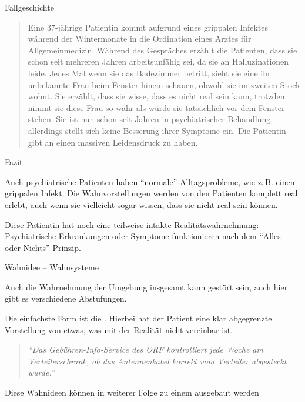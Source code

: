 \Text
{Fallgeschichte}%
{%
\begin{quotation}
Eine 37-jährige Patientin kommt aufgrund eines
grippalen Infektes während der Wintermonate in die
Ordination eines Arztes für Allgemeinmedizin. Während des
Gespräches erzählt die Patienten, dass sie schon seit
mehreren Jahren arbeitsunfähig sei, da sie an
Halluzinationen leide. Jedes Mal wenn sie das Badezimmer
betritt, sieht sie eine ihr unbekannte Frau beim Fenster
hinein schauen, obwohl sie im zweiten Stock wohnt. Sie
erzählt, dass sie wisse, dass es nicht real sein kann,
trotzdem nimmt sie diese Frau so wahr als würde sie
tatsächlich vor dem Fenster stehen. Sie ist nun schon seit
Jahren in psychiatrischer Behandlung, allerdings stellt
sich keine Besserung ihrer Symptome ein. Die Patientin gibt
an einen massiven Leidensdruck zu haben.
\end{quotation}
}%


\Text
{Fazit}%
{%
Auch psychiatrische Patienten haben \enquote{normale}
Alltagsprobleme, wie z.\,B. einen grippalen Infekt. Die
Wahnvorstellungen werden von den Patienten komplett real
erlebt, auch wenn sie vielleicht sogar wissen, dass sie nicht
real sein können. 

Diese Patientin hat noch eine teilweise
intakte Realitätswahrnehmung: Psychiatrische Erkrankungen
oder Symptome funktionieren  nach dem
\enquote{Alles-oder-Nichts}-Prinzip.
}%


\Text
{Wahnidee -- Wahnsysteme}%
{%
Auch die Wahrnehmung der Umgebung insgesamt kann gestört
sein, auch hier gibt es verschiedene Abstufungen. 

Die einfachste Form ist die . Hierbei hat der
Patient eine klar abgegrenzte Vorstellung von etwas, was mit
der Realität nicht vereinbar ist. 

\begin{quotation}
\emph{\enquote{Das
Gebühren-Info-Service des ORF kontrolliert jede Woche am
Verteilerschrank, ob das Antennenkabel korrekt vom
Verteiler abgesteckt wurde.}}
\end{quotation}

Diese Wahnideen können in weiterer Folge zu einem
 ausgebaut werden 



\begin{quotation}
\end{quotation}
}%


